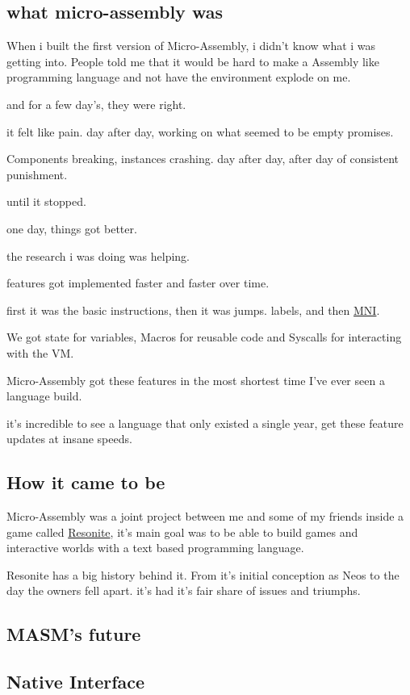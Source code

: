 \documentclass[a4paper,11pt]{book}
\begin{document}
\subsection{what micro-assembly was}
When i built the first version of Micro-Assembly, i didn't know what i was getting into.
People told me that it would be hard to make a Assembly like programming language and not have the environment explode on me.

and for a few day's, they were right.

it felt like pain.
day after day, working on what seemed to be empty promises.

Components breaking, instances crashing.
day after day, after day of consistent punishment.

until it stopped.

one day, things got better.

the research i was doing was helping.

features got implemented faster and faster over time.

first it was the basic instructions, then it was jumps.
labels, and then \hyperref[subpar:MNI]{MNI}.

We got state for variables, Macros for reusable code and Syscalls for interacting with
the VM.

Micro-Assembly got these features in the most shortest time I've ever seen a language build.

it's incredible to see a language that only existed a single year, get these feature updates
at insane speeds.


\subsection{How it came to be}
Micro-Assembly was a joint project between me and some of my friends inside a game called
\hyperref{https://resonite.com}{}{}{Resonite}, it's main goal was to be able to build games and interactive 
worlds with a text based programming language.

Resonite has a big history behind it.
From it's initial conception as Neos to the day the owners fell apart.
it's had it's fair share of issues and triumphs.



\subsection{MASM's future}
\subsection{Native Interface}
\end{document}
